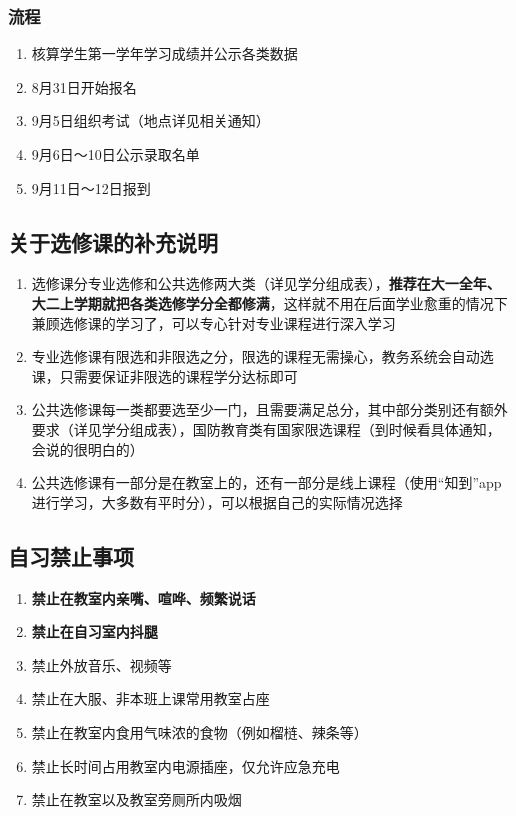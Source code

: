 \subsubsection[流程]{流程}
\begin{enumerate}
    \item 核算学生第一学年学习成绩并公示各类数据
    \item 8月31日开始报名
    \item 9月5日组织考试（地点详见相关通知）
    \item 9月6日～10日公示录取名单\footnotemark
    \item 9月11日～12日报到
\end{enumerate}

\subsection[关于选修课的补充说明]{关于选修课的补充说明}
\begin{enumerate}
    \item 选修课分专业选修和公共选修两大类（详见学分组成表），\textbf{推荐在大一全年、大二上学期就把各类选修学分全都修满}，这样就不用在后面学业愈重的情况下兼顾选修课的学习了，可以专心针对专业课程进行深入学习
    \item 专业选修课有限选和非限选之分，限选的课程无需操心，教务系统会自动选课，只需要保证非限选的课程学分达标即可
    \item 公共选修课每一类都要选至少一门，且需要满足总分，其中部分类别还有额外要求（详见学分组成表），国防教育类有国家限选课程（到时候看具体通知，会说的很明白的）
    \item 公共选修课有一部分是在教室上的，还有一部分是线上课程（使用“知到”app进行学习，大多数有平时分），可以根据自己的实际情况选择
\end{enumerate}

\subsection[自习禁止事项]{自习禁止事项}
\begin{enumerate}
    \item \textbf{禁止在教室内亲嘴、喧哗、频繁说话}
    \item \textbf{禁止在自习室内抖腿}
    \item 禁止外放音乐、视频等
    \item 禁止在大服、非本班上课常用教室占座
    \item 禁止在教室内食用气味浓的食物（例如榴梿、辣条等）
    \item 禁止长时间占用教室内电源插座，仅允许应急充电
    \item 禁止在教室以及教室旁厕所内吸烟
\end{enumerate}

